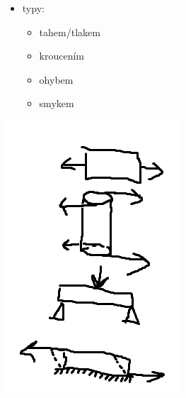 \documentclass{article}
\begin{document}
  \begin{minipage}{0.25\textwidth}\raggedleft
    \begin{itemize}
      \item typy:
      \begin{itemize}
        \item tahem/tlakem
        \item kroucením
        \item ohybem
        \item smykem
      \end{itemize}
    \end{itemize}
  \end{minipage}
  \hspace{0.5cm}
  \noindent\begin{minipage}{0.12\textwidth}
    \includegraphics[width=0.9\linewidth]{deformace}
  \end{minipage}
\end{document}
